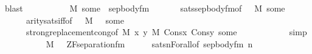 \begin{isabellebody}
\ blast\isanewline
\ \ \ \ \isamarkupfalse%
\isanewline
\ \ \ \ \isamarkupfalse%
\ {\isachardoublequoteopen}M{\isacharcomma}{\kern0pt}\ some\ {\isasymTurnstile}\ sep{\isacharunderscore}{\kern0pt}body{\isacharunderscore}{\kern0pt}fm{\isacharparenleft}{\kern0pt}{\isasymphi}{\isacharparenright}{\kern0pt}{\isachardoublequoteclose}\ \isanewline
\ \ \ \ \isamarkupfalse%
\ sats{\isacharunderscore}{\kern0pt}sep{\isacharunderscore}{\kern0pt}body{\isacharunderscore}{\kern0pt}fm{\isacharbrackleft}{\kern0pt}of\ {\isasymphi}\ {\isachardoublequoteopen}{\isacharbrackleft}{\kern0pt}{\isacharbrackright}{\kern0pt}{\isachardoublequoteclose}\ M\ some{\isacharbrackright}{\kern0pt}\isanewline
\ \ \ \ \ \ arity{\isacharunderscore}{\kern0pt}sats{\isacharunderscore}{\kern0pt}iff{\isacharbrackleft}{\kern0pt}of\ {\isasymphi}\ {\isacharunderscore}{\kern0pt}\ M\ {\isachardoublequoteopen}{\isacharbrackleft}{\kern0pt}{\isacharunderscore}{\kern0pt}{\isacharcomma}{\kern0pt}{\isacharunderscore}{\kern0pt}{\isacharbrackright}{\kern0pt}\ {\isacharat}{\kern0pt}\ some{\isachardoublequoteclose}{\isacharbrackright}{\kern0pt}\isanewline
\ \ \ \ \ \ strong{\isacharunderscore}{\kern0pt}replacement{\isacharunderscore}{\kern0pt}cong{\isacharbrackleft}{\kern0pt}of\ {\isachardoublequoteopen}{\isacharhash}{\kern0pt}{\isacharhash}{\kern0pt}M{\isachardoublequoteclose}\ {\isachardoublequoteopen}{\isasymlambda}x\ y{\isachardot}{\kern0pt}\ M{\isacharcomma}{\kern0pt}\ Cons{\isacharparenleft}{\kern0pt}x{\isacharcomma}{\kern0pt}\ Cons{\isacharparenleft}{\kern0pt}y{\isacharcomma}{\kern0pt}\ some\ {\isacharat}{\kern0pt}\ {\isacharunderscore}{\kern0pt}{\isacharparenright}{\kern0pt}{\isacharparenright}{\kern0pt}\ {\isasymTurnstile}\ {\isasymphi}{\isachardoublequoteclose}\ {\isacharunderscore}{\kern0pt}\ {\isacharbrackright}{\kern0pt}\isanewline
\ \ \ \ \isamarkupfalse%
\ simp\isanewline
\ \ \isacommand{{\isacharbraceright}{\kern0pt}}\isamarkupfalse%
\isanewline
\ \ \isamarkupfalse%
\ {\isacartoucheopen}{\isasymphi}{\isasymin}{\isacharunderscore}{\kern0pt}{\isacartoucheclose}\isanewline
\ \ \isamarkupfalse%
\ {\isachardoublequoteopen}M{\isacharcomma}{\kern0pt}\ {\isacharbrackleft}{\kern0pt}{\isacharbrackright}{\kern0pt}\ {\isasymTurnstile}\ ZF{\isacharunderscore}{\kern0pt}separation{\isacharunderscore}{\kern0pt}fm{\isacharparenleft}{\kern0pt}{\isasymphi}{\isacharparenright}{\kern0pt}{\isachardoublequoteclose}\isanewline
\ \ \ \ \isamarkupfalse%
\ sats{\isacharunderscore}{\kern0pt}nForall{\isacharbrackleft}{\kern0pt}of\ {\isachardoublequoteopen}sep{\isacharunderscore}{\kern0pt}body{\isacharunderscore}{\kern0pt}fm{\isacharparenleft}{\kern0pt}{\isasymphi}{\isacharparenright}{\kern0pt}{\isachardoublequoteclose}\ {\isacharquery}{\kern0pt}n{\isacharbrackright}{\kern0pt}\isanewline

\end{isabellebody}
